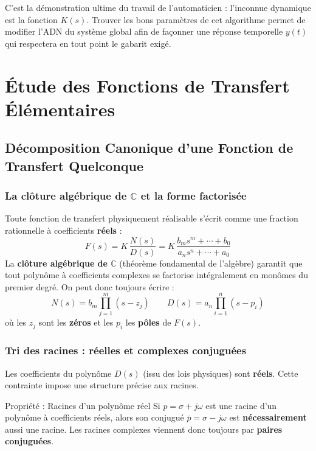 \documentclass[11pt,a4paper]{report}
\begin{document}
C'est la démonstration ultime du travail de l'automaticien : l'inconnue dynamique est la fonction $K(s)$. Trouver les bons paramètres de cet algorithme permet de modifier l'ADN du système global afin de façonner une réponse temporelle $y(t)$ qui respectera en tout point le gabarit exigé.

\chapter{Étude des Fonctions de Transfert Élémentaires}

\section{Décomposition Canonique d'une Fonction de Transfert Quelconque}

\subsection{La clôture algébrique de $\mathbb{C}$ et la forme factorisée}

Toute fonction de transfert physiquement réalisable s'écrit comme une fraction rationnelle à coefficients \textbf{réels} :
\[
  F(s) = K \, \frac{N(s)}{D(s)} = K \, \frac{b_m s^m + \cdots + b_0}{a_n s^n + \cdots + a_0}
\]
La \textbf{clôture algébrique de $\mathbb{C}$} (théorème fondamental de l'algèbre) garantit que tout polynôme à coefficients complexes se factorise intégralement en monômes du premier degré. On peut donc toujours écrire :
\[
  N(s) = b_m \prod_{j=1}^{m}(s - z_j) \qquad D(s) = a_n \prod_{i=1}^{n}(s - p_i)
\]
où les $z_j$ sont les \textbf{zéros} et les $p_i$ les \textbf{pôles} de $F(s)$.

\subsection{Tri des racines : réelles et complexes conjuguées}

Les coefficients du polynôme $D(s)$ (issu des lois physiques) sont \textbf{réels}. Cette contrainte impose une structure précise aux racines.

\begin{defbox}{Propriété : Racines d'un polynôme réel}
  Si $p = \sigma + j\omega$ est une racine d'un polynôme à coefficients réels, alors son conjugué $\bar{p} = \sigma - j\omega$ est \textbf{nécessairement} aussi une racine. Les racines complexes viennent donc toujours par \textbf{paires conjuguées}.
\end{defbox}
\end{document}
